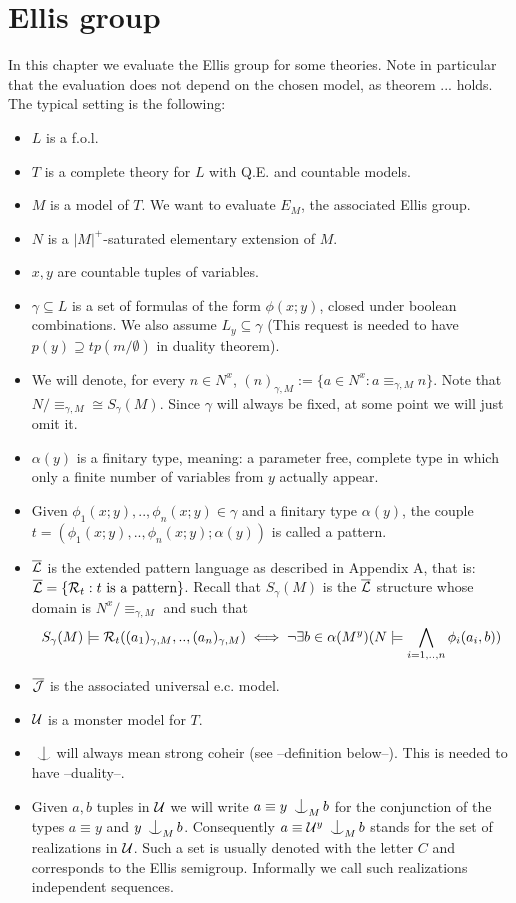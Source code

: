 \documentclass[../main.tex]{subfiles}
\begin{document}
\chapter{Ellis group}
\label{ch:Ellis}

In this chapter we evaluate the Ellis group for some theories. Note in particular that the evaluation does not depend on the chosen model, as theorem ... holds.
The typical setting is the following:
\begin{itemize}
	\item	$L$ is a f.o.l. %
	\item	$T$ is a complete theory for $L$ with Q.E. and countable models.
	\item	$M$ is a model of $T$. We want to evaluate $E_M$, the associated Ellis group.
	\item	$N$ is a $|M|^+$-saturated elementary extension of $M$.
	\item	$x,y$ are countable tuples of variables.
	\item	$\gamma \subseteq L$ is a set of formulas of the form $\phi(x;y)$, closed under boolean combinations.
		We also assume $L_y \subseteq \gamma$ 
		(This request is needed to have $p(y) \supseteq tp(m/\emptyset)$ in duality theorem). 

	\item	We will denote, for every $n \in N^x$, $(n)_{\gamma,M} := \{a \in N^x : a \equiv_{\gamma,M} n\}$. Note that $N/\equiv_{\gamma,M} \cong S_{\gamma}(M)$.
		Since $\gamma$ will always be fixed, at some point we will just omit it.
	\item	$\alpha(y)$ is a finitary type, meaning: a parameter free, complete type in which only a finite number of variables from $y$ actually appear.
	\item	Given $\phi_1(x;y),..,\phi_n(x;y) \in \gamma$ and a finitary type $\alpha(y)$, the couple $t = (\phi_1(x;y),..,\phi_n(x;y);\alpha(y))$ is called a pattern. 
	\item	$\overline{\mathcal{L}}$ is the extended pattern language as described in Appendix A, that is: $\overline{\mathcal{L}} = \{\mathcal{R}_t : t \text{ is a pattern}\}$.
		Recall that $S_\gamma(M)$ is the $\overline{\mathcal{L}}$ structure whose domain is $N^x / \equiv_{\gamma,M}$ and such that 
		\[
			S_\gamma(M) \models \mathcal{R}_t((a_1)_{\gamma,M},..,(a_n)_{\gamma,M}) \iff \neg \exists b \in \alpha(M^y) (N \models \bigwedge_{i=1,..,n} \phi_i(a_i,b))
		\]
	\item	$\mathcal{\overline{J}}$ is the associated universal e.c. model.
	\item	$\mathcal{U}$ is a monster model for $T$.
	\item	$\nonfork$ will always mean strong coheir (see --definition below--). This is needed to have --duality--.
	\item	Given $a,b$ tuples in $\mathcal{U}$ we will write $a \equiv y \nonfork_M b$ for the conjunction of the types $a \equiv y$ and $y \nonfork_M b$.
		Consequently $a \equiv \U^y \nonfork_M b$ stands for the set of realizations in $\mathcal{U}$. 
		Such a set is usually denoted with the letter $C$ and corresponds to the Ellis semigroup.  
		Informally we call such realizations independent sequences.
\end{itemize}
\end{document}
